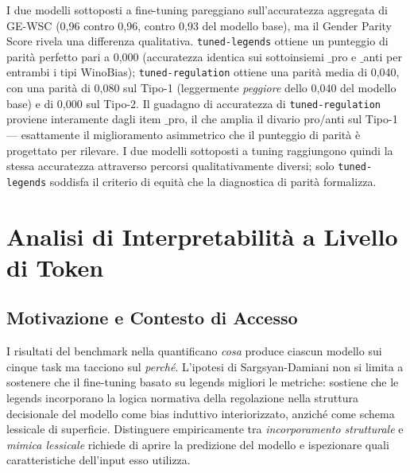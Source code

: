 \documentclass[pdflatex, sn-apa]{sn-jnl}%
\theoremstyle{thmstyleone}%
\theoremstyle{thmstyletwo}%
\theoremstyle{thmstylethree}%
\newcommand{\modellegends}{\texttt{tuned-legends}}
\newcommand{\modelreg}{\texttt{tuned-regulation}}
\begin{document}
I due modelli sottoposti a fine-tuning pareggiano sull'accuratezza aggregata di
GE-WSC (0,96 contro 0,96, contro 0,93 del modello base), ma il Gender Parity
Score rivela una differenza qualitativa. \modellegends{} ottiene un punteggio di
parità perfetto pari a 0,000 (accuratezza identica sui sottoinsiemi $\_$pro e
$\_$anti per entrambi i tipi WinoBias); \modelreg{} ottiene una parità media di
0,040, con una parità di 0,080 sul Tipo-1 (leggermente \emph{peggiore} dello 0,040
del modello base) e di 0,000 sul Tipo-2. Il guadagno di accuratezza di \modelreg{}
proviene interamente dagli item $\_$pro, il che amplia il divario pro/anti sul
Tipo-1 --- esattamente il miglioramento asimmetrico che il punteggio di parità è
progettato per rilevare. I due modelli sottoposti a tuning raggiungono quindi la
stessa accuratezza attraverso percorsi qualitativamente diversi; solo
\modellegends{} soddisfa il criterio di equità che la diagnostica di parità
formalizza.

\FloatBarrier

\section{Analisi di Interpretabilità a Livello di Token}
\label{sec:xai}

\subsection{Motivazione e Contesto di Accesso}
\label{sec:xai:motivation}

I risultati del benchmark nella  quantificano \emph{cosa}
produce ciascun modello sui cinque task ma tacciono sul \emph{perché}. L'ipotesi
di Sargsyan-Damiani non si limita a sostenere che il fine-tuning basato su legends
migliori le metriche: sostiene che le legends incorporano la logica normativa
della regolazione nella struttura decisionale del modello come bias induttivo
interiorizzato, anziché come schema lessicale di superficie. Distinguere
empiricamente tra \emph{incorporamento strutturale} e \emph{mimica lessicale}
richiede di aprire la predizione del modello e ispezionare quali caratteristiche
dell'input esso utilizza.
\end{document}
